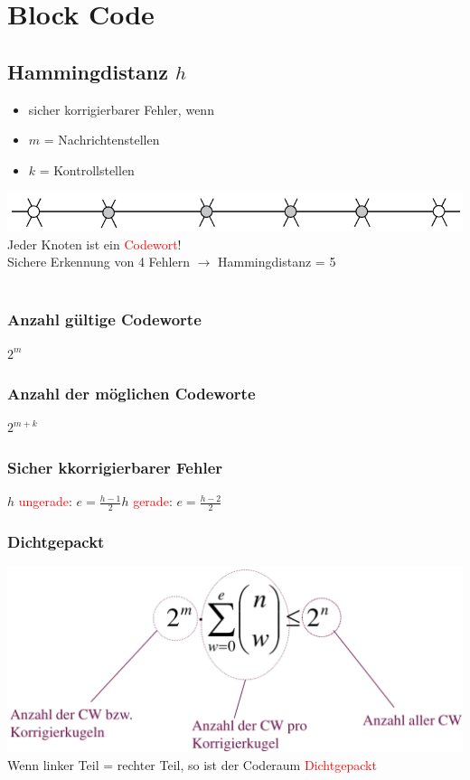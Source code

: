 
\section{Block Code}


\subsection{Hammingdistanz $h$}
\begin{itemize}
    \item sicher korrigierbarer Fehler, wenn
    \item $m$ = Nachrichtenstellen
    \item $k$ = Kontrollstellen
\end{itemize}
\includegraphics[width=\linewidth]{graphic/extern-reto/Hammingdistanz.png}
Jeder Knoten ist ein \textcolor{red}{Codewort}!\\
Sichere Erkennung von 4 Fehlern $\rightarrow$ Hammingdistanz = 5\\\\

\subsubsection{Anzahl gültige Codeworte}
\colorbox{lightlightgrey}{$2^m$}

\subsubsection{Anzahl der möglichen Codeworte}
\colorbox{lightlightgrey}{$2^{m+k}$}

\subsubsection{Sicher kkorrigierbarer Fehler}
$h$ \textcolor{red}{ungerade}: \colorbox{lightlightgrey}{$e = \frac{h - 1}{2}$}\hspace{3cm}$h$ \textcolor{red}{gerade}: \colorbox{lightlightgrey}{$e = \frac{h - 2}{2}$}

\subsubsection{Dichtgepackt}
\includegraphics[width=\linewidth]{graphic/extern-reto/Dichtgepackt.png}\\
Wenn linker Teil = rechter Teil, so ist der Coderaum \textcolor{red}{Dichtgepackt}


